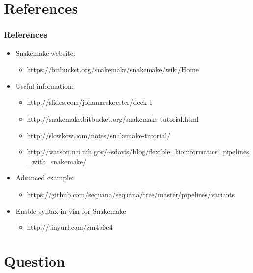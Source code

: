 \documentclass{beamer}
\begin{document}
\section{References}

\begin{frame}
    \frametitle{References}
    \begin{itemize}
        \item Snakemake website:
        \begin{itemize}
            \item {\tiny https://bitbucket.org/snakemake/snakemake/wiki/Home}
        \end{itemize}
        \item Useful information:
        \begin{itemize}
            \item {\tiny http://slides.com/johanneskoester/deck-1}
            \item {\tiny http://snakemake.bitbucket.org/snakemake-tutorial.html}
            \item {\tiny http://slowkow.com/notes/snakemake-tutorial/}
            \item {\tiny http://watson.nci.nih.gov/{\textasciitilde{}}sdavis/blog/flexible\_bioinformatics\_pipelines\_with\_snakemake/}
        \end{itemize}
        \item Advanced example:
        \begin{itemize}
            \item {\tiny https://github.com/sequana/sequana/tree/master/pipelines/variants}
        \end{itemize}
        \item Enable syntax in vim for Snakemake
        \begin{itemize}
            \item {\tiny http://tinyurl.com/zm4b6c4}
        \end{itemize}
    \end{itemize}
\end{frame}

\section{Question}
\end{document}
